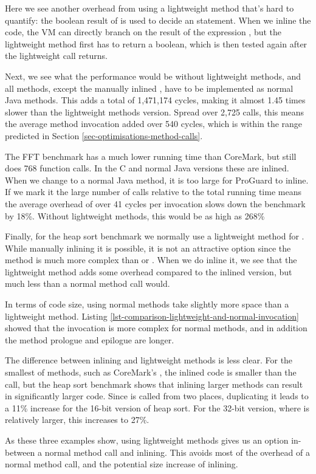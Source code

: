 Here we see another overhead from using a lightweight method that's hard to quantify: the boolean result of  is used to decide an  statement. When we inline the code, the VM can directly branch on the result of the expression , but the lightweight method first has to return a boolean, which is then tested again after the lightweight call returns.

Next, we see what the performance would be without lightweight methods, and all methods, except the manually inlined , have to be implemented as normal Java methods. This adds a total of 1,471,174 cycles, making it almost 1.45 times slower than the lightweight methods version. Spread over 2,725 calls, this means the average method invocation added over 540 cycles, which is within the range predicted in Section \ref{sec-optimisations-method-calls}.

The FFT benchmark has a much lower running time than CoreMark, but still does 768 function calls. In the C and normal Java versions these are inlined. When we change  to a normal Java method, it is too large for ProGuard to inline. If we mark it  the large number of calls relative to the total running time means the average overhead of over 41 cycles per invocation slows down the benchmark by 18\%. Without lightweight methods, this would be as high as 268\%

Finally, for the heap sort benchmark we normally use a lightweight method for . While manually inlining it is possible, it is not an attractive option since the  method is much more complex than  or . When we do inline it, we see that the lightweight method adds some overhead compared to the inlined version, but much less than a normal method call would.

In terms of code size, using normal methods take slightly more space than a lightweight method. Listing \ref{lst-comparison-lightweight-and-normal-invocation} showed that the invocation is more complex for normal methods, and in addition the method prologue and epilogue are longer.

The difference between inlining and lightweight methods is less clear. For the smallest of methods, such as CoreMark's , the inlined code is smaller than the call, but the heap sort benchmark shows that inlining larger methods can result in significantly larger code. Since  is called from two places, duplicating it leads to a 11\% increase for the 16-bit version of heap sort. For the 32-bit version, where  is relatively larger, this increases to 27\%.

As these three examples show, using lightweight methods gives us an option in-between a normal method call and inlining. This avoids most of the overhead of a normal method call, and the potential size increase of inlining.


